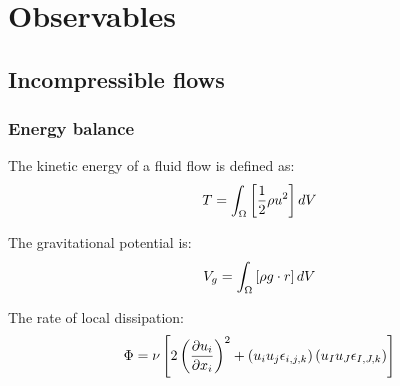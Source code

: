 \chapter{Observables}

\section{Incompressible flows}

\subsection{Energy balance}

The kinetic energy of a fluid flow is defined as:
\begin{equation} \elabel{kinetic-energy}
T = \int_\Omega \left[\frac{1}{2} \rho u^2 \right] dV
\end{equation}

The gravitational potential is:
\begin{equation} \elabel{grav-energy}
V_g = \int_\Omega \left[ \rho  g \cdot r \right] dV
\end{equation}

The rate of local dissipation:
\begin{equation} \elabel{diss-vol-rate}
\Phi = \nu \left[ 2 \left(\pder{u_i}{x_i}\right)^2 + \left(u_i u_j \epsilon_{i,j,k}\right) \left(u_I u_J \epsilon_{I,J,k}\right) \right]
\end{equation}
